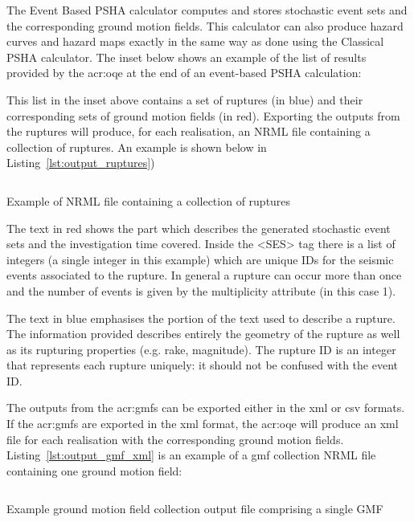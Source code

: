 The Event Based PSHA calculator computes and stores stochastic event sets and
the corresponding ground motion fields. This calculator can also produce
hazard curves and hazard maps exactly in the same way as done using the
Classical PSHA calculator. The inset below shows an example of the list of
results provided by the \gls{acr:oqe} at the end of an event-based PSHA
calculation:



This list in the inset above contains a set of ruptures (in blue) and their
corresponding sets of ground motion fields (in red). Exporting the outputs
from the ruptures will produce, for each realisation, an NRML file containing
a collection of ruptures. An example is shown below in Listing~\ref{lst:output_ruptures})



\begin{listing}[htbp]
  \inputminted[firstline=1,firstnumber=1,fontsize=\footnotesize,frame=single,linenos,bgcolor=lightgray]{xml}{oqum/hazard/verbatim/output_ses}
  \caption{Example of NRML file containing a collection of ruptures}
  \label{lst:output_ruptures}
\end{listing}

The text in red shows the part which describes the generated
stochastic event sets and the investigation time covered. Inside the
<SES> tag there is a list of integers (a single integer in this example)
which are unique IDs for the seismic events associated to the rupture.
In general a rupture can occur more than once and the number of events
is given by the multiplicity attribute (in this case 1).

The text in blue emphasises the portion of the text used to describe a
rupture. The information provided describes entirely the geometry of the
rupture as well as its rupturing properties (e.g. rake, magnitude). The
rupture ID is an integer that represents each rupture uniquely: it should
not be confused with the event ID.

The outputs from the \glspl{acr:gmf} can be exported either in the xml or csv
formats. If the \glspl{acr:gmf} are exported in the xml format, the
\gls{acr:oqe} will produce an xml file for each realisation with the
corresponding ground motion fields. Listing~\ref{lst:output_gmf_xml} is an
example of a gmf collection NRML file containing one ground motion field:

\begin{listing}[htbp]
  \inputminted[firstline=1,firstnumber=1,fontsize=\footnotesize,frame=single,linenos,bgcolor=lightgray]{xml}{oqum/hazard/verbatim/output_gmf.xml}
  \caption{Example ground motion field collection output file comprising a single GMF}
  \label{lst:output_gmf_xml}
\end{listing}

